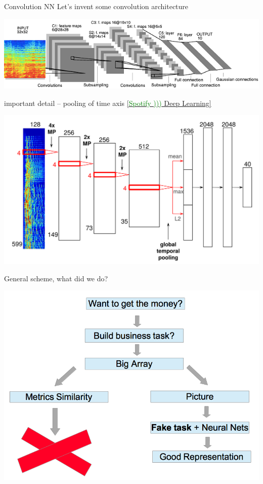 \documentclass{beamer}
\begin{document}
\begin{frame}{Convolution NN} 
		Let's invent some convolution architecture
		\begin{center}
			\includegraphics[scale=0.5]{img/conv}
		\end{center}
		important detail -- pooling of time axis \href{http://bit.ly/1slJTgi}{[\textcolor{green}{Spotify )))} Deep Learning]}
		\begin{center}				
			\includegraphics[scale=1.5]{img/rconv}
		\end{center}
\end{frame}

\begin{frame}{General scheme, what did we do?} 	
	\begin{center}				
		\includegraphics[scale=0.3]{img/scheem}
	\end{center}
\end{frame}
\end{document}
